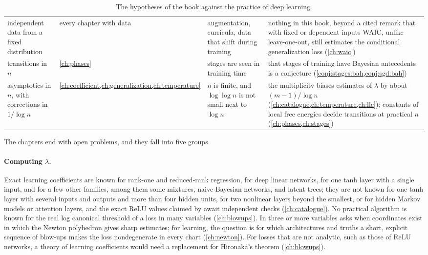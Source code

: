 \begin{refsection}
\begin{table}[tp]
\begin{fullwidth}
\begin{tabularx}{\linewidth}{@{}>{\raggedright\arraybackslash}p{30mm}>{\raggedright\arraybackslash}p{24mm}>{\raggedright\arraybackslash}X>{\raggedright\arraybackslash}X@{}}
independent data from a fixed distribution & every chapter with data & augmentation, curricula, data that shift during training & nothing in this book, beyond a cited remark that with fixed or dependent inputs WAIC, unlike leave-one-out, still estimates the conditional generalization loss (\cref{ch:waic}) \\
transitions in $n$ & \cref{ch:phases} & stages are seen in training time & that stages of training have Bayesian antecedents is a conjecture (\cref{conj:stages:bah,conj:sgd:bah}) \\
asymptotics in $n$, with corrections in $1/\log n$ & \cref{ch:coefficient,ch:generalization,ch:temperature} & $n$ is finite, and $\log\log n$ is not small next to $\log n$ & the multiplicity biases estimates of $\lambda$ by about $(m-1)/\log n$ (\cref{ch:catalogue,ch:temperature,ch:llc}); constants of local free energies decide transitions at practical $n$ (\cref{ch:phases,ch:stages}) \\
\bottomrule
\end{tabularx}
\end{fullwidth}
\caption{The hypotheses of the book against the practice of deep learning.}\label{tab:epilogue:assumptions}
\end{table}


The chapters end with open problems, and they fall into five groups.

\paragraph{Computing $\lambda$.} Exact learning coefficients are known for rank-one and reduced-rank regression, for deep linear networks, for one tanh layer with a single input, and for a few other families, among them some mixtures, naive Bayesian networks, and latent trees; they are not known for one tanh layer with several inputs and outputs and more than four hidden units, for two nonlinear layers beyond the smallest, or for hidden Markov models or attention layers, and the exact ReLU values claimed by \textcite{Aoyagi2025} await independent checks (\cref{ch:catalogue}). No practical algorithm is known for the real log canonical threshold of a loss in many variables (\cref{ch:blowups}). In three or more variables \textcite[Section~1]{Greenblatt2010} asks when coordinates exist in which the Newton polyhedron gives sharp estimates; for learning, the question is for which architectures and truths a short, explicit sequence of blow-ups makes the loss nondegenerate in every chart (\cref{ch:newton}). For losses that are not analytic, such as those of ReLU networks, a theory of learning coefficients would need a replacement for Hironaka's theorem (\cref{ch:blowups}).


\end{refsection}
